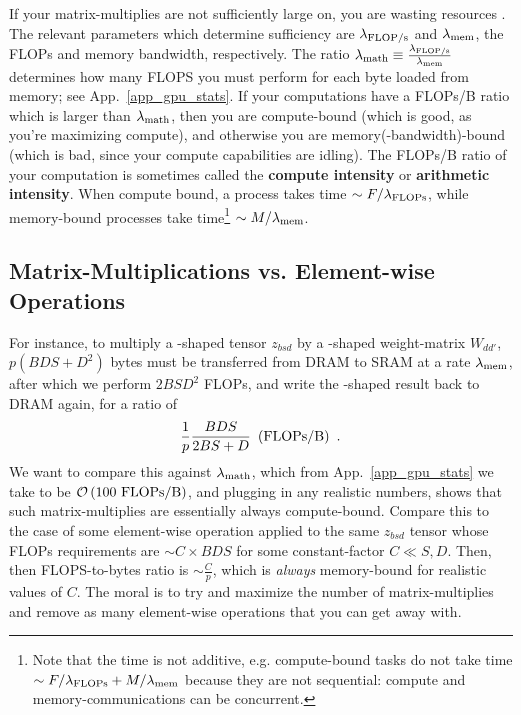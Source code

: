 \documentclass[11pt]{article}
\begin{document}
If your matrix-multiplies are not sufficiently large on,
you are wasting resources \cite{he2022brrrrfromfirstprinciples}. The relevant parameters which
determine sufficiency are $ \lambda _{ {\rm FLOP/s}  } $ and $ \lambda _{ {\rm mem}  } $, the FLOPs
and memory bandwidth, respectively. The ratio $  \lambda _{ {\rm math}  } \equiv \frac{  \lambda _{ {\rm FLOP/s}  } }{ \lambda _{ {\rm mem}  } }   $
determines how many FLOPS you must perform for each byte loaded from memory; see App.~\ref{app_gpu_stats}.
If your computations have a FLOPs/B ratio which is larger than  $ \lambda _{ {\rm math}  } $, then
you are compute-bound (which is good, as you're maximizing compute), and otherwise you are
memory(-bandwidth)-bound (which is bad, since your compute capabilities are idling). The FLOPs/B
ratio of your computation is sometimes called the \textbf{compute intensity} or \textbf{arithmetic
intensity}. When compute bound, a process takes time $ \sim F/\lambda _{ {\rm FLOPs} } $, while
memory-bound processes take time\footnote{Note that the time is not additive, e.g. compute-bound tasks do
not take time $ \sim F/\lambda _{ {\rm FLOPs} } +M/\lambda _{ {\rm mem} }$ because they are not sequential: compute and memory-communications can be concurrent.} $ \sim M/\lambda _{ {\rm mem} } $.



\subsection{Matrix-Multiplications vs. Element-wise Operations}

For instance, to multiply a -shaped tensor $ z _{ bsd } $ by a -shaped
weight-matrix $ W _{ d d' } $, $ p \left ( BDS +D ^{ 2 } \right ) $ bytes must be transferred from
DRAM to SRAM at a rate $ \lambda _{ {\rm  mem}  } $, after which we perform $ 2BSD ^{ 2 } $ FLOPs,
and write the -shaped  result back to DRAM again, for a ratio of
\begin{align}
    \frac{ 1 }{ p } \frac{ BDS }{ 2BS + D } \ \left ( {\rm FLOPs/B} \right )  \ .
\end{align}
We want to compare this against $ \lambda _{ {\rm math}  } $, which from
App.~\ref{app_gpu_stats} we take to be $ \mathcal{O} \left( 100\  {\rm FLOPs/B} \right)  $, and plugging
in any realistic numbers, shows that such matrix-multiplies are essentially always compute-bound.
Compare this to the case of some element-wise operation applied to the same $ z _{ bsd } $ tensor
whose FLOPs requirements are $ \sim C\times BDS $ for some constant-factor $ C \ll S, D $.  Then,
then FLOPS-to-bytes ratio is $ \sim \frac{ C }{ p } $, which is \textit{always} memory-bound for
realistic values of $ C $. The moral is to try and maximize the number of matrix-multiplies and
remove as many element-wise operations that you can get away with.
\end{document}
